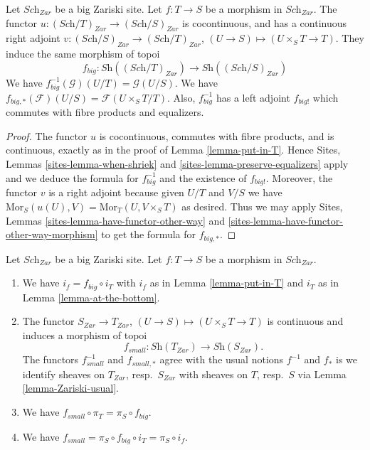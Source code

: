 \begin{lemma}
\label{lemma-morphism-big}
Let $\textit{Sch}_{Zar}$ be a big Zariski site.
Let $f : T \to S$ be a morphism in $\textit{Sch}_{Zar}$.
The functor $u : (\textit{Sch}/T)_{Zar} \to (\textit{Sch}/S)_{Zar}$
is cocontinuous, and has a continuous right adjoint
$v : (\textit{Sch}/S)_{Zar} \to (\textit{Sch}/T)_{Zar}$,
$(U \to S) \mapsto (U \times_S T \to T)$. They induce the same morphism
of topoi
$$
f_{big} :
\textit{Sh}((\textit{Sch}/T)_{Zar})
\longrightarrow
\textit{Sh}((\textit{Sch}/S)_{Zar})
$$
We have $f_{big}^{-1}(\mathcal{G})(U/T) = \mathcal{G}(U/S)$.
We have $f_{big, *}(\mathcal{F})(U/S) = \mathcal{F}(U\times_ST/T)$.
Also, $f_{big}^{-1}$ has a left adjoint $f_{big!}$ which commutes with
fibre products and equalizers.
\end{lemma}

\begin{proof}
The functor $u$ is cocontinuous, commutes with fibre products,
and is continuous, exactly as in the proof of Lemma \ref{lemma-put-in-T}.
Hence Sites, Lemmas \ref{sites-lemma-when-shriek}
and \ref{sites-lemma-preserve-equalizers}
apply and we deduce the formula
for $f_{big}^{-1}$ and the existence of $f_{big!}$. Moreover,
the functor $v$ is a right adjoint because given $U/T$ and $V/S$
we have $\text{Mor}_S(u(U), V) = \text{Mor}_T(U, V\times_S T)$
as desired. Thus we may apply
Sites, Lemmas \ref{sites-lemma-have-functor-other-way} and
\ref{sites-lemma-have-functor-other-way-morphism} to get the
formula for $f_{big, *}$.
\end{proof}

\begin{lemma}
\label{lemma-morphism-big-small}
Let $\textit{Sch}_{Zar}$ be a big Zariski site.
Let $f : T \to S$ be a morphism in $\textit{Sch}_{Zar}$.
\begin{enumerate}
\item We have $i_f = f_{big} \circ i_T$ with $i_f$ as in
Lemma \ref{lemma-put-in-T} and $i_T$ as in Lemma \ref{lemma-at-the-bottom}.
\item The functor $S_{Zar} \to T_{Zar}$,
$(U \to S) \mapsto (U \times_S T \to T)$ is continuous and induces
a morphism of topoi
$$
f_{small} :
\textit{Sh}(T_{Zar})
\longrightarrow
\textit{Sh}(S_{Zar}).
$$
The functors $f_{small}^{-1}$ and $f_{small, *}$ agree with
the usual notions $f^{-1}$ and $f_*$ is we identify sheaves
on $T_{Zar}$, resp.\ $S_{Zar}$ with sheaves on $T$, resp.\ $S$
via Lemma \ref{lemma-Zariski-usual}.
\item We have $f_{small} \circ \pi_T = \pi_S \circ f_{big}$.
\item We have $f_{small} = \pi_S \circ f_{big} \circ i_T = \pi_S \circ i_f$.
\end{enumerate}
\end{lemma}

